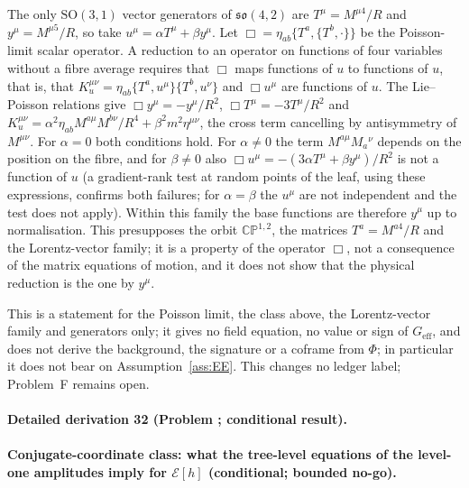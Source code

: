 The only \(\mathrm{SO}(3,1)\) vector generators of \(\mathfrak{so}(4,2)\) are \(T^\mu=M^{\mu4}/R\) and \(y^\mu=M^{\mu5}/R\), so take \(u^\mu=\alpha T^\mu+\beta y^\mu\). Let \(\Box=\eta_{ab}\{T^a,\{T^b,\cdot\}\}\) be the Poisson-limit scalar operator. A reduction to an operator on functions of four variables without a fibre average requires that \(\Box\) maps functions of \(u\) to functions of \(u\), that is, that \(K_u^{\mu\nu}=\eta_{ab}\{T^a,u^\mu\}\{T^b,u^\nu\}\) and \(\Box u^\mu\) are functions of \(u\). The Lie--Poisson relations give \(\Box y^\mu=-y^\mu/R^2\), \(\Box T^\mu=-3T^\mu/R^2\) and \(K_u^{\mu\nu}=\alpha^2\eta_{ab}M^{a\mu}M^{b\nu}/R^4+\beta^2m^2\eta^{\mu\nu}\), the cross term cancelling by antisymmetry of \(M^{\mu\nu}\). For \(\alpha=0\) both conditions hold. For \(\alpha\neq0\) the term \(M^{a\mu}M_a{}^{\nu}\) depends on the position on the fibre, and for \(\beta\neq0\) also \(\Box u^\mu=-(3\alpha T^\mu+\beta y^\mu)/R^2\) is not a function of \(u\) (a gradient-rank test at random points of the leaf, using these expressions, confirms both failures; for \(\alpha=\beta\) the \(u^\mu\) are not independent and the test does not apply). Within this family the base functions are therefore \(y^\mu\) up to normalisation. This presupposes the orbit \(\mathbb{CP}^{1,2}\), the matrices \(T^a=M^{a4}/R\) and the Lorentz-vector family; it is a property of the operator \(\Box\), not a consequence of the matrix equations of motion, and it does not show that the physical reduction is the one by \(y^\mu\).



This is a statement for the Poisson limit, the class above, the Lorentz-vector family and generators only; it gives no field equation, no value or sign of \(G_{\mathrm{eff}}\), and does not derive the background, the signature or a coframe from \(\Phi\); in particular it does not bear on Assumption~\ref{ass:EE}. This changes no ledger label; Problem~F remains open.



\paragraph{Detailed derivation 32 (Problem ; conditional result).} \label{ref:detail-31} %



\paragraph{Conjugate-coordinate class: what the tree-level equations of the level-one amplitudes imply for \(\mathcal E[h]\) (conditional; bounded no-go).}

